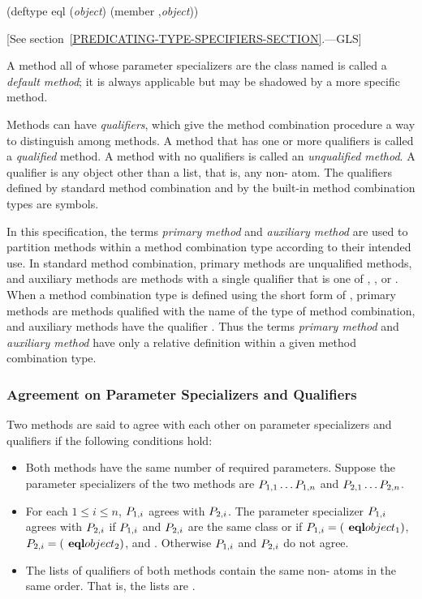\begin{lisp}
(deftype eql (\emph{object}) {\Xbq}(member ,\emph{object}))
\end{lisp}
[See section~\ref{PREDICATING-TYPE-SPECIFIERS-SECTION}.---GLS]

A method all of whose parameter specializers are the class named 
 is called a \emph{default method}; it is always applicable but
may be shadowed by a more specific method.

Methods can have \emph{qualifiers}, which give the method combination
procedure a way to distinguish among methods.  A method that has one
or more qualifiers is called a \emph{qualified} method.
A method with no qualifiers is called an \emph{unqualified method}. 
A qualifier is any object other than a list, that is,
any non- atom.  The qualifiers defined by standard method combination
and by the built-in method combination types are symbols.

In this specification, the terms \emph{primary method} and \emph{auxiliary
  method} are used to partition methods within a method 
combination type according to their intended use.  In standard method
combination, primary methods are unqualified methods, and auxiliary
methods are methods with a single qualifier that is one of 
, , or .  When a method combination
type is defined using the short form of 
, primary methods are methods qualified with
the name of the type of method combination, and auxiliary methods have
the qualifier .  Thus the terms \emph{primary method}
and \emph{auxiliary method} have only a relative definition within a
given method combination type.

\subsubsection{Agreement on Parameter Specializers and Qualifiers}
\label{Agreement-on-Parameter-Specializers-and-Qualifiers-SECTION}

Two methods are said to agree with each other on parameter specializers
and qualifiers if the following conditions hold:

\begin{itemize}

\item Both methods have the same number of required parameters.
Suppose the parameter specializers of the two methods are
$P_{1,1}\ldots P_{1,n}$
and $P_{2,1}\ldots P_{2,n}$.

\item For each $1\leq i\leq n$,
$P_{1,i}$ agrees with $P_{2,i}$.
The parameter specializer $P_{1,i}$
agrees with $P_{2,i}$ if
$P_{1,i}$ and $P_{2,i}$ are the same class or if 
$P\sub{1,i}=(\cdf{eql} object_1)$,
$P\sub{2,i}=(\cdf{eql} object_2)$, and
.
Otherwise $P_{1,i}$ and $P_{2,i}$ do not agree.

\item The lists of qualifiers of both methods contain the same 
non- atoms in the same order. That is, the lists are .
\end{itemize}

